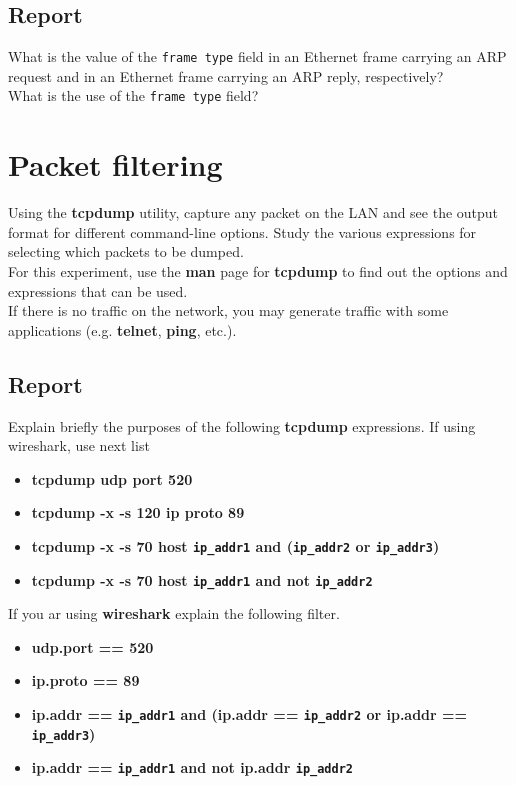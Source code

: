 \documentclass{../UTNetLab}
\begin{document}
    \subsection*{Report}
    What is the value of the \texttt{frame type} field in an Ethernet frame carrying an ARP request and in an Ethernet frame carrying an ARP reply, respectively? \\
    What is the use of the \texttt{frame type} field? \\

\section{Packet filtering}
    Using the \textbf{tcpdump} utility, capture any packet on the LAN and see the output format
    for different command-line options. Study the various expressions for selecting
    which packets to be dumped.\\
    For this experiment, use the \textbf{man} page for \textbf{tcpdump} to find out the options and
    expressions that can be used.\\
    If there is no traffic on the network, you may generate traffic with some applications
    (e.g. \textbf{telnet}, \textbf{ping}, etc.).\\
    \subsection*{Report}
    Explain briefly the purposes of the following \textbf{tcpdump} expressions. If using wireshark, use next list
    \begin{itemize}
        \item \textbf{tcpdump udp port 520}
        \item \textbf{tcpdump -x -s 120 ip proto 89}
        \item \textbf{tcpdump -x -s 70 host \texttt{ip\_addr1} and (\texttt{ip\_addr2} or \texttt{ip\_addr3})}
        \item \textbf{tcpdump -x -s 70 host \texttt{ip\_addr1} and not \texttt{ip\_addr2}}
    \end{itemize}
    If you ar using \textbf{wireshark} explain the following filter.
    \begin{itemize}
        \item \textbf{udp.port == 520}
        \item \textbf{ip.proto == 89}
        \item \textbf{ip.addr == \texttt{ip\_addr1} and (ip.addr == \texttt{ip\_addr2} or ip.addr == \texttt{ip\_addr3})}
        \item \textbf{ip.addr == \texttt{ip\_addr1} and not ip.addr \texttt{ip\_addr2}}
    \end{itemize}
\end{document}
